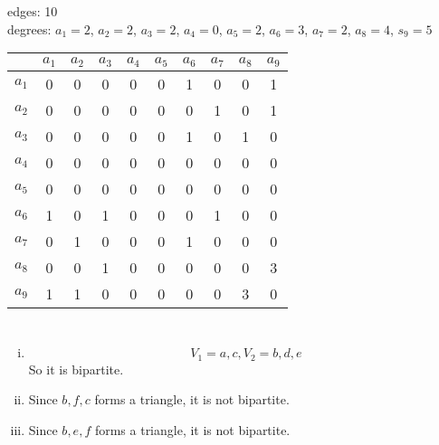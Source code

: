\documentclass{article}
\begin{document}
\begin{enumerate}[i)]
edges: 10\\
degrees: $a_1=2$, $a_2=2$, $a_3=2$, $a_4=0$, $a_5=2$, $a_6=3$, $a_7=2$, $a_8=4$, $s_9=5$
\begin{table}[!h]
\begin{center}
\begin{tabular}{c|ccccccccc}
	 &$a_1$&$a_2$&$a_3$&$a_4$&$a_5$&$a_6$&$a_7$&$a_8$&$a_9$\\ \hline
$a_1$&	0  &  0  &  0  &  0  &  0  &  1  &  0  &  0  &  1  \\
$a_2$&	0  &  0  &  0  &  0  &  0  &  0  &  1  &  0  &  1 \\
$a_3$&	0  &  0  &  0  &  0  &  0  &  1  &  0  &  1  &  0  \\
$a_4$&	0  &  0  &  0  &  0  &  0  &  0  &  0  &  0  &  0  \\
$a_5$&	0  &  0  &  0  &  0  &  0  &  0  &  0  &  0  &  0  \\
$a_6$&	1  &  0  &  1  &  0  &  0  &  0  &  1  &  0  &  0  \\
$a_7$&	0  &  1  &  0  &  0  &  0  &  1  &  0  &  0  &  0  \\
$a_8$&	0  &  0  &  1  &  0  &  0  &  0  &  0  &  0  &  3  \\
$a_9$&	1  &  1  &  0  &  0  &  0  &  0  &  0  &  3  &  0  \\
\end{tabular}
\end{center}
\end{table}
\end{enumerate}

\section{}
\begin{enumerate}[i)]
\item
$$V_1={a,c},V_2={b,d,e}$$
So it is bipartite.
\item
Since $b,f,c$ forms a triangle, it is not bipartite.
\item
Since $b,e,f$ forms a triangle, it is not bipartite.
\end{enumerate}
\end{document}
